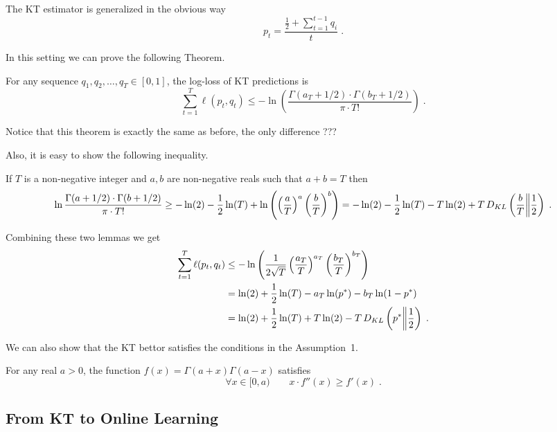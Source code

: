 The KT estimator is generalized in the obvious way
$$
p_t = \frac{\frac{1}{2} + \sum_{t=1}^{t-1} q_i}{t}\; .
$$

In this setting we can prove the following Theorem.
\begin{theorem}
\label{theo:logloss}
For any sequence $q_1, q_2, \dots, q_T \in [0,1]$, the log-loss of KT
predictions is
$$
\sum_{t=1}^T \ell(p_t, q_t) \leq - \ln \left( \frac{\Gamma(a_T + 1/2) \cdot \Gamma(b_T + 1/2)}{\pi \cdot T!} \right) \; .
$$
\end{theorem}
Notice that this theorem is exactly the same as before, the only difference ???





Also, it is easy to show the following inequality.
\begin{lemma}
\label{lemma:approx_gamma}
If $T$ is a non-negative integer and $a,b$ are non-negative reals such that $a +
b = T$ then
$$
\ln \frac{\Gamma(a + 1/2) \cdot \Gamma(b + 1/2)}{\pi \cdot T!} 
\geq -\ln(2) -\frac{1}{2} \ln(T) +\ln \left(\left( \frac{a}{T} \right)^a \left( \frac{b}{T} \right)^b\right) 
= -\ln(2) -\frac{1}{2} \ln(T) -T \ln (2) + T \, D_{KL}\left(\frac{b}{T}\middle\|\frac{1}{2}\right)\; .
$$
\end{lemma}

Combining these two lemmas we get
\begin{align*}
\sum_{t=1}^T \ell(p_t, q_t)
& \le - \ln \left( \frac{1}{2\sqrt{T}} \left( \frac{a_T}{T} \right)^{a_T} \left( \frac{b_T}{T} \right)^{b_T} \right) \\
& = \ln(2) + \frac{1}{2} \ln(T) - a_T \ln (p^*) - b_T \ln (1-p^*) \\
& = \ln(2) + \frac{1}{2} \ln(T) + T \ln (2) -T \, D_{KL}\left(p^*\middle\|\frac{1}{2}\right) \; .
\end{align*}


We can also show that the \ac{KT} bettor satisfies the conditions in the Assumption~1.
\begin{lemma}
\label{lemma:gamma-function}
For any real $a > 0$, the function $f(x) = \Gamma(a+x) \Gamma(a-x)$ satisfies
$$
\forall x \in [0, a) \qquad x \cdot f''(x) \ge f'(x) \; .
$$
\end{lemma}


\subsection{From KT to Online Learning}

